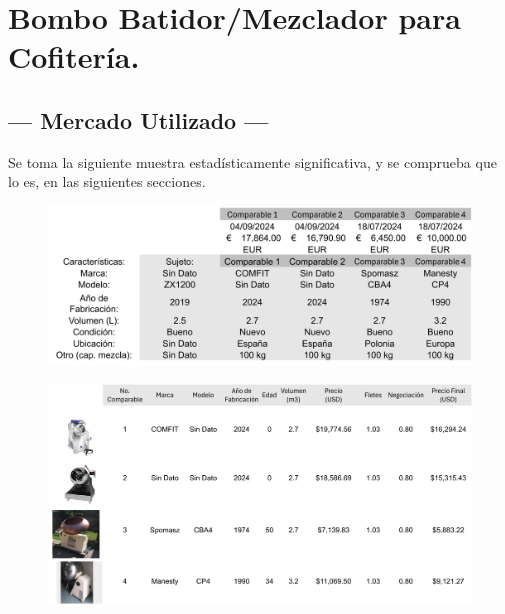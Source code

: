 
\section{Bombo Batidor/Mezclador para Cofitería.} %

\subsection{\centering --- Mercado Utilizado ---} %
Se toma la siguiente muestra estadísticamente significativa, y se 
comprueba que lo es, en las siguientes secciones.
\begin{figure}[hbtp!]
	\centering
\includegraphics[width=  0.6\linewidth, page = 1]{../0.imagenes/CAP_8/mercado_3_1}
\end{figure}
\begin{figure}[hbtp!]
	\centering
\includegraphics[width=  0.8\linewidth, page = 1]{../0.imagenes/CAP_8/mercado_3_2}
\end{figure}

